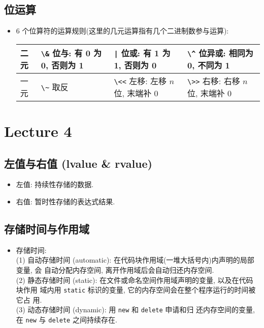 \documentclass[a4paper,UTF8]{ctexart}
\begin{document}
\subsection{位运算}

\begin{itemize}[leftmargin=0pt, rightmargin=0cm, labelwidth=0.8cm, labelsep=0.2cm]
\item 6 个位算符的运算规则(这里的几元运算指有几个二进制数参与运算):
\vspace{-5pt}
\begin{center}
\begin{tabularx}{\textwidth}{| l | X | X | X |}
\hline
二元 & \lstinline$\&$ 位与: 有 0 为 0, 否则为 1 & \lstinline$|$ 位或: 有 1 为 1, 否则为
0 & \lstinline$\^$ 位异或: 相同为 0, 不同为 1 \\ \hline
一元 & \lstinline$\~$ 取反  & \lstinline$\<<$ 左移: 左移 $n$ 位,
末端补 0 & \lstinline$\>>$ 右移: 右移 $n$ 位, 末端补 0 \\ \hline
\end{tabularx}
\end{center}
\vspace{-5pt}
\end{itemize}

\section{Lecture 4}

\subsection{左值与右值 (lvalue \& rvalue)}

\begin{itemize}[leftmargin=0pt, rightmargin=0cm, labelwidth=0.8cm, labelsep=0.2cm]
\item 左值: 持续性存储的数据.
\item 右值: 暂时性存储的表达式结果.
\end{itemize}

\subsection{存储时间与作用域}

\begin{itemize}[leftmargin=0pt, rightmargin=0cm, labelwidth=0.8cm, labelsep=0.2cm]
\item 存储时间:\\
  (1) 自动存储时间 (automatic): 在代码块作用域(一堆大括号内)内声明的局部变量, 会
  自动分配内存空间, 离开作用域后会自动归还内存空间. \\
  (2) 静态存储时间 (static): 在文件或命名空间作用域声明的变量, 以及在代码块作用
  域内用 \lstinline{static} 标识的变量, 它的内存空间会在整个程序运行的时间被它占
  用. \\
  (3) 动态存储时间 (dynamic): 用 \lstinline{new} 和 \lstinline{delete} 申请和归
  还内存空间的变量, 在 \lstinline{new} 与 \lstinline{delete} 之间持续存在.
\end{itemize}
\end{document}
